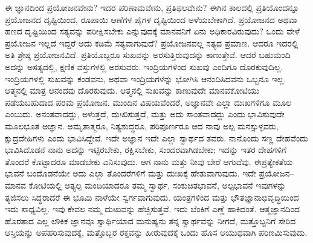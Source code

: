 ಈ ಜ್ಞಾನದಿಂದ ಪ್ರಯೋಜನವೇನು? ಇದರ ಪರಿಣಾಮವೇನು, ಪ್ರತಿಫಲವೇನು? ಈಗಿನ ಕಾಲದಲ್ಲಿ ಪ್ರತಿಯೊಂದನ್ನೂ ಪ್ರಯೋಜನದ ದೃಷ್ಟಿಯಿಂದ, ರೂಪಾಯಿ ಆಣೆಗಳ ಪೈಗಳ ದೃಷ್ಟಿಯಿಂದ ಅಳೆಯಬೇಕಾಗಿದೆ. ಪ್ರಯೋಜನದ ಅಥವಾ ಹಣದ ದೃಷ್ಟಿಯಿಂದ ಸತ್ಯವನ್ನು ಪರೀಕ್ಷಿಸಬೇಕು ಎನ್ನುವುದಕ್ಕೆ ಮಾನವನಿಗೆ ಏನು ಅಧಿಕಾರವಿರುವುದು? ಒಂದು ವೇಳೆ ಪ್ರಯೋಜನ ಇಲ್ಲದೆ ಇದ್ದರೆ ಅದು ಕಡಿಮೆ ಸತ್ಯವಾಗುವುದೆ? ಪ್ರಯೋಜನವಲ್ಲ ಸತ್ಯದ ಪ್ರಮಾಣ. ಆದರೂ ಇದರಲ್ಲಿ ಅತಿ ಶ್ರೇಷ್ಠ ಪ್ರಯೋಜನವಿದೆ. ಪ್ರತಿಯೊಬ್ಬರೂ ಸುಖವನ್ನು ಅರಸುತ್ತಿರುವುದನ್ನು ಕಾಣುತ್ತೇವೆ. ಆದರೆ ಬಹುಮಂದಿ ಅದನ್ನು ಅಸತ್ಯದಲ್ಲಿ, ಕ್ಷಣಿಕ ವಸ್ತುಗಳಲ್ಲಿ ಅರಸುವರು. ಇಂದ್ರಿಯಗಳಿಂದ ಸುಖವು ಎಂದಿಗೂ ದೊರಕುವುದಿಲ್ಲ. ಇಂದ್ರಿಯಗಳಲ್ಲಿ ಸುಖವನ್ನು ಕಂಡವನು, ಅಥವಾ ಇಂದ್ರಿಯಗಳನ್ನು ಭೋಗಿಸಿ ಆನಂದಿಸಿದವನು ಒಬ್ಬನೂ ಇಲ್ಲ. ಆತ್ಮನಲ್ಲಿ ಮಾತ್ರ ಆನಂದವು ದೊರಕುವುದು. ಆತ್ಮನಲ್ಲಿ ಸುಖವನ್ನು ಕಾಣುವುದೇ ಮಾನವಕೋಟಿಯು ಪಡೆಯಬಹುದಾದ ಪರಮ ಪ್ರಯೋಜನ. ಮುಂದಿನ ವಿಷಯವೆಂದರೆ, ಅಜ್ಞಾನವೇ ಎಲ್ಲಾ ದುಃಖಗಳಿಗೂ ಮೂಲ ಎಂಬುದು. ಅನಂತವಾದದ್ದು, ಅಳುತ್ತದೆ, ದುಃಖಿಸುತ್ತದೆ, ಮತ್ತು ಅದು ಸಾಂತವಾದದ್ದು ಎಂದು ಭಾವಿಸುವುದೇ ಮೂಲಭೂತ ಅಜ್ಞಾನ. ಅಮೃತಾತ್ಮರೂ, ನಿತ್ಯಶುದ್ಧರೂ, ಪರಿಪೂರ್ಣರೂ ಆದ ನಾವು ಅಲ್ಪ ಮನಸ್ಸುಳ್ಳವರು, ಕ್ಷುದ್ರದೇಹಿಗಳು ಎಂದು ಭಾವಿಸಿದ್ದೇವೆ. ಇದೇ ಅಜ್ಞಾನ ಇದೇ ಎಲ್ಲಾ ಸ್ವಾರ್ಥದ ತವರು. ನಾನೊಂದು ಸಣ್ಣ ದೇಹವೆಂದು ಭಾವಿಸಿದೊಡನೆ ನಾನು ಅದನ್ನು ಇಟ್ಟಿರಬೇಕು, ರಕ್ಷಿಸಬೇಕು, ಸುಂದರವಾಗಿಡಬೇಕು; ಇದನ್ನು ಇತರ ದೇಹಗಳಿಗೆ ತೊಂದರೆ ಕೊಟ್ಟಾದರೂ ಮಾಡಬೇಕು ಎನಿಸುವುದು. ಆಗ ನಾನು ಮತ್ತು ನೀವು ಬೇರೆ ಆಗುವೆವು. ಈ\break ಪ್ರತ್ಯೇಕತೆಯ ಭಾವನೆ ಬಂದೊಡನೆಯೇ ಅದು ಎಲ್ಲಾ ತೊಂದರೆಗಳಿಗೆ ಮತ್ತು ದುಃಖಕ್ಕೆ ಹೇತುವಾಗುವುದು. ಇದೇ ಪ್ರಯೋಜನ– ಮಾನವ ಕೋಟಿಯಲ್ಲಿ ಅತ್ಯಲ್ಪ ಮಂದಿಯಾದರೂ ತಮ್ಮ ಸ್ವಾರ್ಥ, ಸಂಕುಚಿತಭಾವನೆ, ಅಲ್ಪಭಾವನೆ ಇವುಗಳನ್ನು ತ್ಯಜಿಸಲು ಸಿದ್ಧರಾದರೆ ಈ ಭೂಮಿ ನಾಳೆಯೇ ಸ್ವರ್ಗವಾಗುವುದು. ಯಂತ್ರಗಳಿಂದ ಮತ್ತು ಭೌತಜ್ಞಾನಾಭಿವೃದ್ಧಿಯಿಂದ ಇದು ಸಾಧ್ಯವಿಲ್ಲ. ಇವು ಕೇವಲ ನಮ್ಮ ದುಃಖವನ್ನು ಹೆಚ್ಚಿಸುತ್ತವೆ. ಇದು ಬೆಂಕಿಗೆ ಎಣ್ಣೆ ಹಾಕಿದಂತೆ. ಆತ್ಮಜ್ಞಾನದಿಂದ ಹೊರತಾದ ಎಲ್ಲ ಲೌಕಿಕ ಜ್ಞಾನವೂ ಸ್ವಾರ್ಥಿಯಾದ ಮನುಷ್ಯನು ತನ್ನ ಸ್ವಾರ್ಥವನ್ನು ನೀಗದೆ, ಮತ್ತೊಬ್ಬನಿಗೆ ಸೇರಿದ ಆಸ್ತಿಯನ್ನು ಅಪಹರಿಸುವುದಕ್ಕೆ, ಮತ್ತೊಬ್ಬರ ರಕ್ತವನ್ನು ಹೀರುವುದಕ್ಕೆ ಒಂದು ಹೊಸ ಆಯುಧವಾಗಿ ಪರಿಣಮಿಸುವುದು.

\vskip 0.2cm

